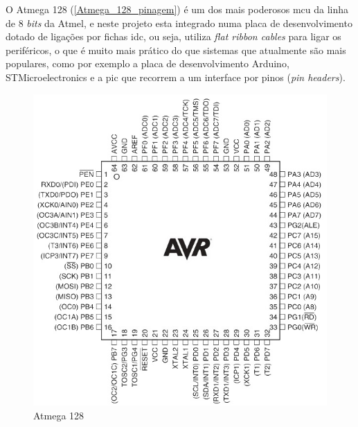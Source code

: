 O Atmega 128 (\autoref{Atmega_128_pinagem}) é um dos mais poderosos \ac{mcu} da linha de 8 \textit{bits} da Atmel, e neste projeto esta integrado numa placa de desenvolvimento dotado de ligações por fichas \ac{idc}, ou seja, utiliza \textit{flat ribbon cables} para ligar os periféricos, o que é muito mais prático do que sistemas que atualmente são mais populares, como por exemplo a placa de desenvolvimento Arduino, STMicroelectronics e a \ac{pic} que recorrem a um interface por pinos (\textit{pin headers}).\\
\begin{figure}[H]
	\centering
	\includegraphics[scale=0.5]{./image/PESTA/material/Atmega128_1.jpg}
	\caption{Atmega 128}
	\label{Atmega_128_pinagem}
\end{figure}
